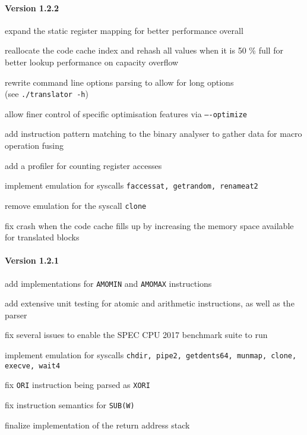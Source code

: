 \paragraph{Version 1.2.2}
\begin{itemize*}
 	\item expand the static register mapping for better performance overall
 	\item reallocate the code cache index and rehash all values when it is 50 \% full for better lookup performance on capacity overflow
 	\item rewrite command line options parsing to allow for long options\\(see \texttt{./translator -h})
 	\item allow finer control of specific optimisation features via \texttt{----optimize}
 	\item add instruction pattern matching to the binary analyser to gather data for macro operation fusing
 	\item add a profiler for counting register accesses
 	\item implement emulation for syscalls \texttt{faccessat, getrandom, renameat2}
 	\item remove emulation for the syscall \texttt{clone}
 	\item fix crash when the code cache fills up by increasing the memory space available for translated blocks
\end{itemize*}


\paragraph{Version 1.2.1}
\begin{itemize*}
 	\item add implementations for \texttt{AMOMIN} and \texttt{AMOMAX} instructions
 	\item add extensive unit testing for atomic and arithmetic instructions, as well as the parser
 	\item fix several issues to enable the SPEC CPU 2017 benchmark suite to run
 	\item implement emulation for syscalls \texttt{chdir, pipe2, getdents64, munmap, clone, execve, wait4}
 	\item fix \texttt{ORI} instruction being parsed as \texttt{XORI}
 	\item fix instruction semantics for \texttt{SUB(W)}
 	\item finalize implementation of the return address stack
\end{itemize*}



